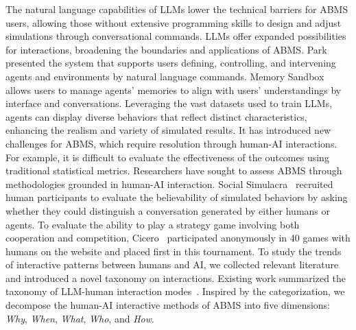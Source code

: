 The natural language capabilities of LLMs lower the technical barriers for ABMS users, allowing those without extensive programming skills to design and adjust simulations through conversational commands.
LLMs offer expanded possibilities for interactions, broadening the boundaries and applications of ABMS.
Park\etal~\cite{10.1145/3586183.3606763} presented the system that supports users defining, controlling, and intervening agents and environments by natural language commands. 
Memory Sandbox~\cite{10.1145/3586182.3615796} allows users to manage agents' memories to align with users' understandings by interface and conversations.
Leveraging the vast datasets used to train LLMs, agents can display diverse behaviors that reflect distinct characteristics, enhancing the realism and variety of simulated results.
It has introduced new challenges for ABMS, which require resolution through human-AI interactions.
For example, it is difficult to evaluate the effectiveness of the outcomes using traditional statistical metrics.
Researchers have sought to assess ABMS through methodologies grounded in human-AI interaction.
Social Simulacra~\cite{10.1145/3526113.3545616} recruited human participants to evaluate the believability of simulated behaviors by asking whether they could distinguish a conversation generated by either humans or agents.
To evaluate the ability to play a strategy game involving both cooperation and competition, Cicero~\cite{doi:10.1126/science.ade9097} participated anonymously in 40 games with humans on the website and placed first in this tournament.
To study the trends of interactive patterns between humans and AI, we collected relevant literature and introduced a novel taxonomy on interactions.
Existing work summarized the taxonomy of LLM-human interaction modes~\cite{10.1145/3613905.3650786}.
Inspired by the categorization, we decompose the human-AI interactive methods of ABMS into five dimensions: \textit{Why}, \textit{When}, \textit{What}, \textit{Who}, and \textit{How}.
